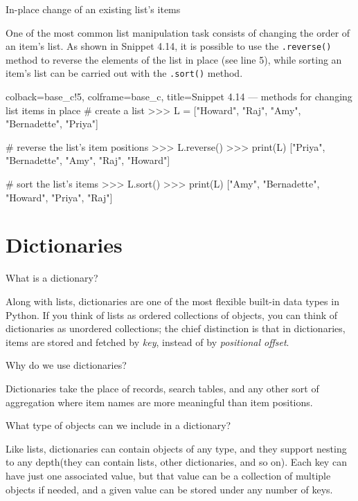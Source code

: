 \documentclass[a4paper,11pt]{book}
\numberwithin{figure}{chapter}
\numberwithin{table}{chapter}
\newcommand{\question}[1]{%
    \begin{tcolorbox}[colback=comp_c!10,colframe=comp_c,sidebyside align=top,width=\linewidth,before skip=1ex]
        #1
    \end{tcolorbox}
    \switchcolumn%
}
\newcommand{\note}[1]{%
    \begin{tcolorbox}[colback=white!0,colframe=white!10,width=\linewidth,before skip=1ex]
        #1
    \end{tcolorbox}
}
\begin{document}
\begin{paracol}{2}
	\question{\raggedright In-place change of an existing list's items}
	\note{One of the most common list manipulation task consists of changing the order of an item's list. As shown in Snippet 4.14, it is possible to use the \texttt{.reverse()} method to reverse the elements of the list in place (see line 5), while sorting an item's list can be carried out with the \texttt{.sort()} method.}
\end{paracol}

\begin{pythoncode}[linenos=true,]{colback=base_c!5, colframe=base_c, title=\sffamily Snippet 4.14 --- methods for changing list items in place}
# create a list 
>>> L = ["Howard", "Raj", "Amy", "Bernadette", "Priya"]

# reverse the list's item positions
>>> L.reverse()
>>> print(L)
["Priya", "Bernadette", "Amy", "Raj", "Howard"]

# sort the list's items
>>> L.sort()
>>> print(L)
["Amy", "Bernadette", "Howard", "Priya", "Raj"]

\end{pythoncode}
\clearpage

\section{Dictionaries}
\label{sec:dictionaries}

\begin{paracol}{2}
	\question{\raggedright What is a dictionary?}
	\note{Along with lists, dictionaries are one of the most flexible built-in data types in Python. If you think of lists as ordered collections of objects, you can think of dictionaries as unordered collections; the chief distinction is that in dictionaries, items are stored and fetched by \emph{key}, instead of by \emph{positional offset}.}
\end{paracol}

\begin{paracol}{2}
	\question{\raggedright Why do we use dictionaries?}
	\note{Dictionaries take the place of records, search tables, and any other sort of aggregation where item names are more meaningful than item positions.}
\end{paracol}

\begin{paracol}{2}
	\question{\raggedright What type of objects can we include in a dictionary?}
	\note{Like lists, dictionaries can contain objects of any type, and they support nesting to any depth(they can contain lists, other dictionaries, and so on). Each key can have just one associated value, but that value can be a collection of multiple objects if needed, and a given value can be stored under any number of keys.}
\end{paracol}
\end{document}

